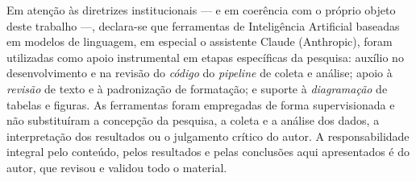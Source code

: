 \documentclass[12pt, %
openright,
oneside, %
a4paper,    %
english,   %
brazil]{facom-ufu-abntex2}
\begin{document}
Em atenção às diretrizes institucionais --- e em coerência com o próprio objeto
deste trabalho ---, declara-se que ferramentas de Inteligência Artificial baseadas
em modelos de linguagem, em especial o assistente Claude (Anthropic), foram
utilizadas como apoio instrumental em etapas específicas da pesquisa: auxílio no
desenvolvimento e na revisão do \emph{código} do \emph{pipeline} de coleta e
análise; apoio à \emph{revisão} de texto e à padronização de formatação; e suporte
à \emph{diagramação} de tabelas e figuras. As ferramentas foram empregadas de forma
supervisionada e não substituíram a concepção da pesquisa, a coleta e a análise dos
dados, a interpretação dos resultados ou o julgamento crítico do autor. A
responsabilidade integral pelo conteúdo, pelos resultados e pelas conclusões aqui
apresentados é do autor, que revisou e validou todo o material.

\postextual




\end{document}
